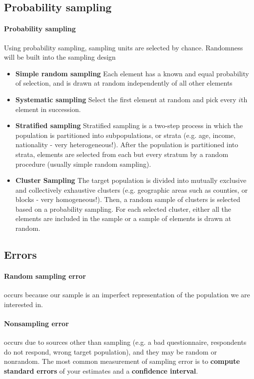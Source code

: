 \documentclass[11pt]{article}
\begin{document}
    \subsection{Probability sampling} 

    \paragraph{Probability sampling} Using probability sampling, sampling units are selected by chance. Randomness will be built into the sampling design

    \begin{itemize}
        \item \textbf{Simple random sampling} Each element has a known and equal probability of selection, and is drawn at random independently of all other elements
        \item \textbf{Systematic sampling} Select the first element at random and pick every $i$th element in succession.
        \item \textbf{Stratified sampling} Stratified sampling is a two-step process in which the population is partitioned into subpopulations, or strata (e.g. age, income, nationality - very heterogeneous!). After the population is partitioned into strata, elements are selected from each but every stratum by a random procedure (usually simple random sampling).
        \item \textbf{Cluster Sampling} The target population is divided into mutually exclusive and collectively exhaustive clusters (e.g. geographic areas such as counties, or blocks - very homogeneous!). Then, a random sample of clusters is selected based on a probability sampling. For each selected cluster, either all the elements are included in the sample or a sample of elements is drawn at random.
    \end{itemize}

    \subsection{Errors} 
    \paragraph{Random sampling error} occurs because our sample is an imperfect representation of the population we are interested in. 
    \paragraph{Nonsampling error} occurs due to sources other than sampling (e.g. a bad questionnaire, respondents do not respond, wrong target population), and they may be random or nonrandom. 
    The most common measurement of sampling error is to\textbf{ compute standard errors} of your estimates and a \textbf{confidence interval}.
\end{document}
